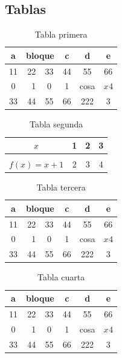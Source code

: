 \subsection{Tablas}
\begin{table}[h!] \label{tb:tabla1}
	\begin{center}
		
		\begin{tabular}{|c|r|c|c|cc|}
			\hline
			a & \multicolumn{2}{r|}{bloque} & c & d & e \\
			\hline
			11 & 22 & 33 & 44 & 55 & 66 \\
			
			0 & 1 & 0 & 1 & cosa & $x^{}4$ \\
			\hline
			33 & 44 & 55 & 66 & 222 & 3 \\
			\hline
		\end{tabular}
	\end{center}
	\caption{Tabla primera}
\end{table}
\begin{table}[h!] \label{tb:tabla2}
	
	\begin{center}
		\begin{tabular}{c|ccc}
			
			$x$ & 1 & 2 & 3 \\
			\hline \\ [-0.2cm]
			$f(x)=x+1$ & 2 & 3 & 4 \\
			
		\end{tabular}
	\end{center}
	\caption{Tabla segunda}
\end{table}
\begin{table}[h!]\label{tb:tabla3}
	\begin{center}
		\renewcommand{\arraystretch}{2}
		\begin{tabular}{|c|r|c|c|c|c|}
			\hline
			a & \multicolumn{2}{r|}{bloque} & c & d & e \\
			\hline
			11 & 22 & 33 & 44 & 55 & 66 \\ 
			\hline
			0 & 1 & 0 & 1 & cosa & $x^{}4$ \\
			\hline
			33 & 44 & 55 & 66 & 222 & 3 \\
			\hline
		\end{tabular}
	\end{center}
	\caption{Tabla tercera}
\end{table}
\renewcommand{\arraystretch}{1}
\begin{table}[h!] \label{tb:tabla4}
	\begin{center}
		
		\begin{tabular}{|c|r|c|c|c|c|}
			\hline
			a & \multicolumn{2}{r|}{bloque} & c & d & e \\
			\hline
			11 & 22 & 33 & 44 & 55 & 66 \\ 
			\hline
			0 & 1 & 0 & 1 & cosa & $x^{}4$ \\
			\hline
			33 & 44 & 55 & 66 & 222 & 3 \\
			\hline
		\end{tabular}
	\end{center}
	\caption{Tabla cuarta}
\end{table}

